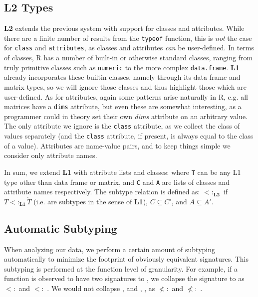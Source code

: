 \documentclass[acmsmall,10pt,review,anonymous]{acmart}\settopmatter{printfolios=true,printccs=false,printacmref=false}
\newcommand{\code}[1]{\lstinline|#1|\xspace}
\begin{document}
\subsection{L2 Types}
\label{sec:L2def}

{\bf L2} extends the previous system with support for classes and attributes.
While there are a finite number of results from the \code{typeof} function, this is {\it not} the case for \code{class} and \code{attributes}, as classes and attributes {\it can} be user-defined. 
In terms of classes, R has a number of built-in or otherwise standard classes, ranging from truly primitive classes such as {\tt numeric} to the more complex {\tt data.frame}. 
{\bf L1} already incorporates these builtin classes, namely through its data frame and matrix types, so we will ignore those classes and thus highlight those which are user-defined.  
As for attributes, again some patterns arise naturally in R, e.g. all matrices have a {\tt dims} attribute, but even these are somewhat interesting, as a programmer could in theory set their own {\it dims} attribute on an arbitrary value.
The only attribute we ignore is the {\tt class} attribute, as we collect the class of values separately (and the {\tt class} attribute, if present, is always equal to the class of a value).
Attributes are name-value pairs, and to keep things simple we consider only attribute names.

In sum, we extend {\bf L1} with attribute lists and classes:  where {\tt T} can be any L1 type other than data frame or matrix, and {\tt C} and {\tt A} are lists of classes and attribute names respectively.  
The subtype relation is defined as:  $<:_{\mathbf{L2}}$ \xspace {} if $ T <:_{\mathbf{L1}} \dot T$ (i.e. are subtypes in the sense of {\bf L1}), $C \subseteq C'$, and $A \subseteq A'$.

\subsection{Automatic Subtyping}
\label{sec:autosub}

When analyzing our data, we perform a certain amount of subtyping automatically to minimize the footprint of obviously equivalent signatures.
This subtyping is performed at the function level of granularity.
For example, if a function is observed to have two signatures \sD \to \df to \D \to \df, we collapse the signature to \D \to \df as \sD $<:$ \D and \df $<:$ \df.
We would not collapse \sD, \I \to \df and \D, \sI \to \df, as \I $\not <:$ \sI and \D $\not<:$ \sD.
\end{document}

